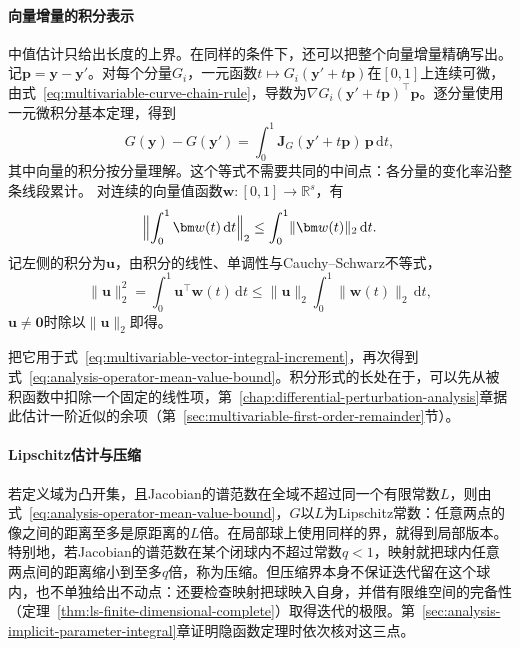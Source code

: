 \paragraph{向量增量的积分表示}
中值估计只给出长度的上界。在同样的条件下，还可以把整个向量增量精确写出。记$\bm p=\bm y-\bm y'$。对每个分量$G_i$，一元函数$t\mapsto G_i(\bm y'+t\bm p)$在$[0,1]$上连续可微，由式~\eqref{eq:multivariable-curve-chain-rule}，导数为$\nabla G_i(\bm y'+t\bm p)^\top\bm p$。逐分量使用一元微积分基本定理，得到
\begin{equation}
 G(\bm y)-G(\bm y')=\int_0^1\bm J_G(\bm y'+t\bm p)\,\bm p\,\mathrm dt,
\label{eq:multivariable-vector-integral-increment}
\end{equation}
其中向量的积分按分量理解。这个等式不需要共同的中间点：各分量的变化率沿整条线段累计。
对连续的向量值函数$\bm w:[0,1]\to\mathbb R^s$，有
\[
 \Bigl\lVert\int_0^1\bm w(t)\,\mathrm dt\Bigr\rVert_2\leq\int_0^1\lVert\bm w(t)\rVert_2\,\mathrm dt .
\]
记左侧的积分为$\bm u$，由积分的线性、单调性与Cauchy--Schwarz不等式，
\[
 \lVert\bm u\rVert_2^2=\int_0^1\bm u^\top\bm w(t)\,\mathrm dt\leq\lVert\bm u\rVert_2\int_0^1\lVert\bm w(t)\rVert_2\,\mathrm dt,
\]
$\bm u\neq\bm0$时除以$\lVert\bm u\rVert_2$即得。

把它用于式~\eqref{eq:multivariable-vector-integral-increment}，再次得到式~\eqref{eq:analysis-operator-mean-value-bound}。积分形式的长处在于，可以先从被积函数中扣除一个固定的线性项，第~\ref{chap:differential-perturbation-analysis}章据此估计一阶近似的余项（第~\ref{sec:multivariable-first-order-remainder}节）。

\paragraph{Lipschitz估计与压缩}
若定义域为凸开集，且Jacobian的谱范数在全域不超过同一个有限常数$L$，则由式~\eqref{eq:analysis-operator-mean-value-bound}，$G$以$L$为Lipschitz常数：任意两点的像之间的距离至多是原距离的$L$倍。在局部球上使用同样的界，就得到局部版本。
特别地，若Jacobian的谱范数在某个闭球内不超过常数$q<1$，映射就把球内任意两点间的距离缩小到至多$q$倍，称为压缩。但压缩界本身不保证迭代留在这个球内，也不单独给出不动点：还要检查映射把球映入自身，并借有限维空间的完备性（定理~\ref{thm:ls-finite-dimensional-complete}）取得迭代的极限。第~\ref{sec:analysis-implicit-parameter-integral}章证明隐函数定理时依次核对这三点。
